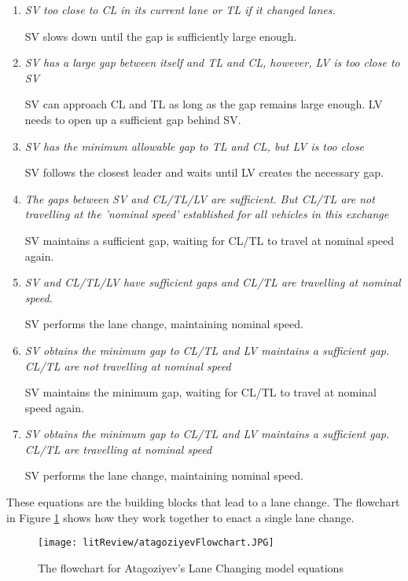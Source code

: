 \begin{enumerate}
\item[Case 1] \textit{SV too close to CL in its current lane or TL if it changed lanes.}

SV slows down until the gap is sufficiently large enough.
\item[Case 2] \textit{SV has a large gap between itself and TL and CL, however, LV is too close to SV}

SV can approach CL and TL as long as the gap remains large enough. LV needs to open up a sufficient gap behind SV.
\item[Case 3] \textit{SV has the minimum allowable gap to TL and CL, but LV is too close}

SV follows the closest leader and waits until LV creates the necessary gap.
\item[Case 4] \textit{The gaps between SV and CL/TL/LV are sufficient. But CL/TL are not travelling at the 'nominal speed' established for all vehicles in this exchange}

SV maintains a sufficient gap, waiting for CL/TL to travel at nominal speed again.
\item[Case 5] \textit{SV and CL/TL/LV have sufficient gaps and CL/TL are travelling at nominal speed.}

SV performs the lane change, maintaining nominal speed.
\item[Case 6] \textit{SV obtains the minimum gap to CL/TL and LV maintains a sufficient gap. CL/TL are not travelling at nominal speed}

SV maintains the minimum gap, waiting for CL/TL to travel at nominal speed again.
\item[Case 7] \textit{SV obtains the minimum gap to CL/TL and LV maintains a sufficient gap. CL/TL are travelling at nominal speed}

SV performs the lane change, maintaining nominal speed.
\end{enumerate}

These equations are the building blocks that lead to a lane change. The flowchart in Figure \ref{fig:AtogoziyevFlowchart} shows how they work together to enact a single lane change.

\begin{figure}[htb]
\texttt{[image: litReview/atagoziyevFlowchart.JPG]}
\caption{The flowchart for Atagoziyev's Lane Changing model equations}
\label{fig:AtogoziyevFlowchart}
\end{figure}

